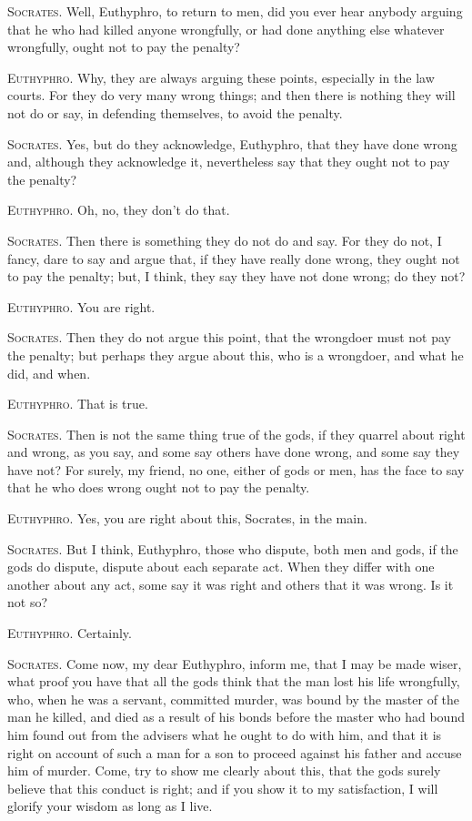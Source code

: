 \textsc{Socrates}. Well, Euthyphro, to return to men, did you ever
hear anybody arguing that he who had killed anyone wrongfully, or had
done anything else whatever wrongfully, ought not to pay the penalty?

\textsc{Euthyphro}. Why, they are always arguing these points,
especially in the law courts. For they do very many wrong things; and
then there is nothing they will not do or say, in defending
themselves, to avoid the penalty.

\textsc{Socrates}. Yes, but do they acknowledge, Euthyphro, that they
have done wrong and, although they acknowledge it, nevertheless say
that they ought not to pay the penalty?

\textsc{Euthyphro}. Oh, no, they don't do that.

\textsc{Socrates}. Then there is something they do not do and
say. For they do not, I fancy, dare to say and argue that, if they
have really done wrong, they ought not to pay the penalty; but, I
think, they say they have not done wrong; do they not?

\textsc{Euthyphro}. You are right.

\textsc{Socrates}. Then they do not argue this point, that the
wrongdoer must not pay the penalty; but perhaps they argue about this,
who is a wrongdoer, and what he did, and when.

\textsc{Euthyphro}. That is true.

\textsc{Socrates}. Then is not the same thing true of the gods, if
they quarrel about right and wrong, as you say, and some say others
have done wrong, and some say they have not? For surely, my friend, no
one, either of gods or men, has the face to say that he who does wrong
ought not to pay the penalty.

\textsc{Euthyphro}. Yes, you are right about this, Socrates, in the
main.

\textsc{Socrates}. But I think, Euthyphro, those who dispute, both men
and gods, if the gods do dispute, dispute about each separate act.
When they differ with one another about any act, some say it was right
and others that it was wrong. Is it not so?

\textsc{Euthyphro}. Certainly.

\textsc{Socrates}. Come now, my dear Euthyphro, inform me, that I may
be made wiser, what proof you have that all the gods think that the
man lost his life wrongfully, who, when he was a servant, committed
 murder, was bound by the master of the man he killed, and
died as a result of his bonds before the master who had bound him
found out from the advisers what he ought to do with him, and that it
is right on account of such a man for a son to proceed against his
father and accuse him of murder. Come, try to show me clearly about
this, that the gods surely believe that this conduct is right; and if
you show it to my satisfaction, I will glorify your wisdom as long
as I live.

